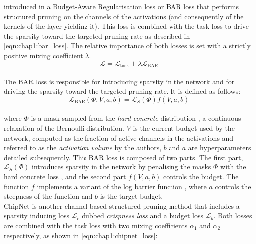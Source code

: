 \citeauthor{lemaire2019structured} introduced in \cite{lemaire2019structured} a
Budget-Aware Regularisation loss or BAR loss that performs structured pruning on
the channels of the activations (and consequently of the kernels of the layer
yielding it). This loss is combined with the task loss to drive the sparsity
toward the targeted pruning rate as described in \cref{eqn:chap1:bar_loss}. The
relative importance of both losses is set with a strictly positive mixing
coefficient $\lambda$.\\

\begin{equation}
  \label{eqn:chap1:bar_loss}
  \mathcal{L} = \mathcal{L}_{\text{task}} + \lambda \mathcal{L}_{\text{BAR}}
\end{equation}\\

\noindent The BAR loss is responsible for introducing sparsity in the network
and for driving the sparsity toward the targeted pruning rate. It is defined as
follows:\\ 

\begin{equation}
  \mathcal{L}_{\text{BAR}}(\Phi,V,a,b) = \mathcal{L}_S(\Phi)f(V,a,b)
\end{equation}\\

\noindent where $\Phi$ is a mask sampled from the \emph{hard concrete}
distribution \cite{louizos2017learning}, a continuous relaxation of the
Bernoulli distribution. $V$ is the current budget used by the network, computed
as the fraction of active channels in the activations and referred to as the
\emph{activation volume} by the authors, $b$ and $a$ are hyperparameters detailed
subsequently. This BAR loss is composed of two parts. The first part,
$\mathcal{L}_S(\Phi)$ introduces sparsity in the network by penalising the masks
$\Phi$ with the hard concrete loss \cite{louizos2017learning}, and the second
part $f(V,a,b)$ controls the budget. The function $f$ implements a variant of
the log barrier function \cite{boyd2004convex}, where $a$ controls the steepness
of the function and $b$ is the target budget.\\

ChipNet \cite{tiwari2021chipnet} is another channel-based structured pruning
method that includes a sparsity inducing loss $\mathcal{L}_c$ dubbed
\emph{crispness loss} and a budget loss $\mathcal{L}_b$. Both losses are
combined with the task loss with two mixing coefficients $\alpha_1$ and
$\alpha_2$ respectively, as shown in \cref{eqn:chap1:chipnet_loss}:\\


